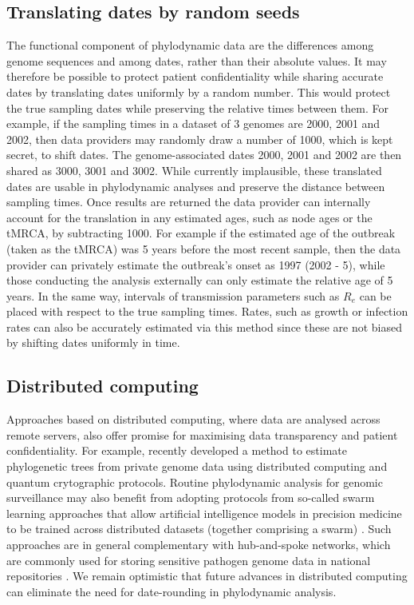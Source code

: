 \documentclass[12pt]{article}
\begin{document}
\begin{spacing}{2}
\subsection*{Translating dates by random seeds}
The functional component of phylodynamic data are the differences among genome sequences and among dates, rather than their absolute values. It may therefore be possible to protect patient confidentiality while sharing accurate dates by translating dates uniformly by a random number. This would protect the true sampling dates while preserving the relative times between them. For example, if the sampling times in a dataset of 3 genomes are 2000, 2001 and 2002, then data providers may randomly draw a number of 1000, which is kept secret, to shift dates. The genome-associated dates 2000, 2001 and 2002 are then shared as 3000, 3001 and 3002. While currently implausible, these translated dates are usable in phylodynamic analyses and preserve the distance between sampling times. Once results are returned the data provider can internally account for the translation in any estimated ages, such as node ages or the tMRCA, by subtracting 1000. For example if the estimated age of the outbreak (taken as the tMRCA) was 5 years before the most recent sample, then the data provider can privately estimate the outbreak's onset as 1997 (2002 - 5), while those conducting the analysis externally can only estimate the relative age of 5 years. In the same way, intervals of transmission parameters such as $R_e$ can be placed with respect to the true sampling times. Rates, such as growth or infection rates can also be accurately estimated via this method since these are not biased by shifting dates uniformly in time.

\subsection*{Distributed computing}
Approaches based on distributed computing, where data are analysed across remote servers, also offer promise for maximising data transparency and patient confidentiality. For example, \citet{santos_private_2022} recently developed a method to estimate phylogenetic trees from private genome data using distributed computing and quantum crytographic protocols. Routine phylodynamic analysis for genomic surveillance may also benefit from adopting protocols from so-called swarm learning approaches that allow artificial intelligence models in precision medicine to be trained across distributed datasets (together comprising a swarm) \citep{warnat-herresthal_swarm_2021}. Such approaches are in general complementary with hub-and-spoke networks, which are commonly used for storing sensitive pathogen genome data in national repositories \citep{hoang_austrakka_2022}. We remain optimistic that future advances in distributed computing can eliminate the need for date-rounding in phylodynamic analysis.


\end{spacing}
\end{document}
